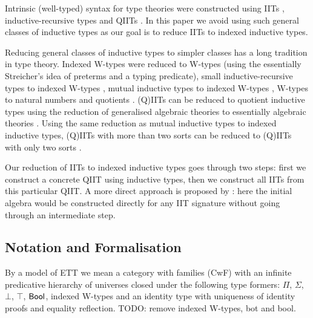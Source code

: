 \documentclass[a4paper,UKenglish,cleveref, autoref]{lipics-v2019}
\begin{document}
Intrinsic (well-typed) syntax for type theories were constructed using
IITs \cite{chapman09eatitself}, inductive-recursive types
\cite{nisse,Altenkirch:2014:CO:2631172.2631176} and QIITs
\cite{ttintt}. In this paper we avoid using such general classes of
inductive types as our goal is to reduce IITs to indexed inductive
types.

Reducing general classes of inductive types to simpler classes has a
long tradition in type theory. Indexed W-types were reduced to W-types
\cite{indexedcont} (using the essentially Streicher's idea of preterms
and a typing predicate), small inductive-recursive types to indexed
W-types \cite{malatasta13smallir}, mutual inductive types to indexed
W-types \cite{mutual}, W-types to natural numbers and quotients
\cite{Ahrens2019}. (Q)IITs can be reduced to quotient inductive types
using the reduction of generalised algebraic theories to essentially
algebraic theories \cite{gat}. Using the same reduction as mutual
inductive types to indexed inductive types, (Q)IITs with more than two
sorts can be reduced to (Q)IITs with only two sorts \cite{szumiemail}.

Our reduction of IITs to indexed inductive types goes through two
steps: first we construct a concrete QIIT using inductive types, then
we construct all IITs from this particular QIIT. A more direct
approach is proposed by \cite{erasure}: here the initial algebra would
be constructed directly for any IIT signature without going through an
intermediate step.

\subsection{Notation and Formalisation}

\begin{definition}
  By a model of ETT we mean a category with families (CwF)
  \cite{Dybjer96internaltype,Hofmann97syntaxand} with an infinite
  predicative hierarchy of universes closed under the following type
  formers: $\Pi$, $\Sigma$, $\bot$, $\top$, $\mathsf{Bool}$, indexed W-types
  \cite{indexedcont} and an identity type with uniqueness of identity
  proofs and equality reflection. TODO: remove indexed W-types, bot
  and bool.
\end{definition}
\end{document}
